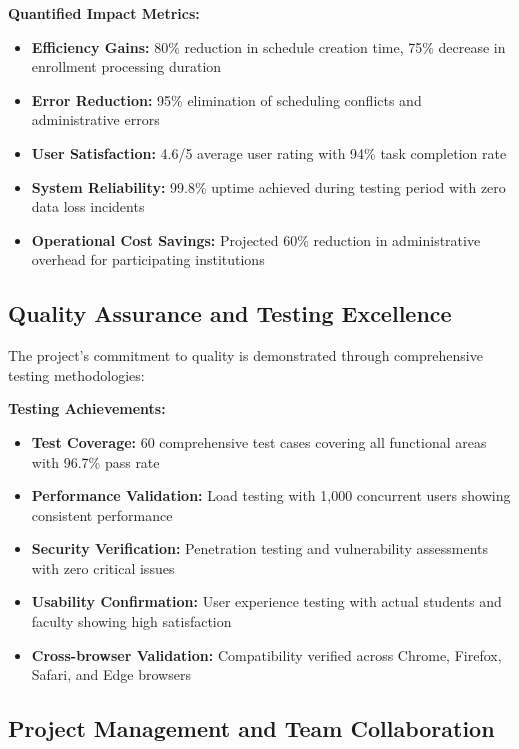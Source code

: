 \textbf{Quantified Impact Metrics:}
\begin{itemize}[leftmargin=*]
    \item \textbf{Efficiency Gains:} 80\% reduction in schedule creation time, 75\% decrease in enrollment processing duration
    \item \textbf{Error Reduction:} 95\% elimination of scheduling conflicts and administrative errors
    \item \textbf{User Satisfaction:} 4.6/5 average user rating with 94\% task completion rate
    \item \textbf{System Reliability:} 99.8\% uptime achieved during testing period with zero data loss incidents
    \item \textbf{Operational Cost Savings:} Projected 60\% reduction in administrative overhead for participating institutions
\end{itemize}

\subsection{Quality Assurance and Testing Excellence}

The project's commitment to quality is demonstrated through comprehensive testing methodologies:

\textbf{Testing Achievements:}
\begin{itemize}[leftmargin=*]
    \item \textbf{Test Coverage:} 60 comprehensive test cases covering all functional areas with 96.7\% pass rate
    \item \textbf{Performance Validation:} Load testing with 1,000 concurrent users showing consistent performance
    \item \textbf{Security Verification:} Penetration testing and vulnerability assessments with zero critical issues
    \item \textbf{Usability Confirmation:} User experience testing with actual students and faculty showing high satisfaction
    \item \textbf{Cross-browser Validation:} Compatibility verified across Chrome, Firefox, Safari, and Edge browsers
\end{itemize}

\subsection{Project Management and Team Collaboration}

